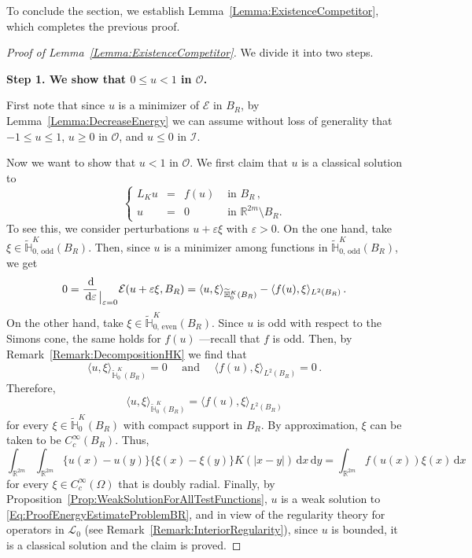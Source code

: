 \documentclass[12pt,reqno]{amsart}
\theoremstyle{definition}
\theoremstyle{remark}
\newcommand{\con}[1]{\mathbb{#1}}
\newcommand{\R}{\con{R}} %
\renewcommand{\H}{\con{H}}
\newcommand{\ecal}{\mathcal{E}}
\newcommand{\ical}{\mathcal{I}}
\newcommand{\lcal}{\mathcal{L}}
\newcommand{\ocal}{\mathcal{O}}
\renewcommand{\d}{\,\mathrm{d}} %
\newcommand\evalat[1]{_{\mkern1.5mu\big\vert_{\scriptstyle #1}}}
\newcommand\beqc[1]{\left\{\begin{array}{#1}}
\newcommand\eeqc{\end{array} \right.}
\def\PDEsystem{rcll}
\numberwithin{equation}{section}
\begin{document}
To conclude the section, we establish Lemma~\ref{Lemma:ExistenceCompetitor}, which completes the previous proof.

\begin{proof}[Proof of Lemma~\ref{Lemma:ExistenceCompetitor}] We divide it into two steps.
	\medskip
	
	\textbf{Step 1. We show that $0\leq u < 1$ in $\ocal$.}
	
	First note that since $u$ is a minimizer of $\ecal$ in $B_R$, by Lemma~\ref{Lemma:DecreaseEnergy} we can assume without loss of generality that $-1 \leq u \leq 1$, $u \geq 0$ in $\ocal$, and $u \leq 0$ in $\ical$. 
	
	
	Now we want to show that $u < 1$ in $\ocal$. We first claim that $u$ is a classical solution to
	\begin{equation}
	\label{Eq:ProofEnergyEstimateProblemBR}
	\beqc{\PDEsystem}
	L_K  u &=& f(u) & \textrm{ in } B_R\,,\\
	u &=& 0 & \textrm{ in }\R^{2m} \setminus B_R.
	\eeqc
	\end{equation}
	To see this, we consider perturbations $u +  \varepsilon \xi$ with $\varepsilon>0$. On the one hand, take $\xi \in \widetilde{\H}^K_{0, \,\mathrm{odd}}(B_R)$. Then, since $u$ is a minimizer among functions in $\widetilde{\H}^K_{0, \,\mathrm{odd}}(B_R)$, we get
	$$
	0 = \dfrac{\d}{\d \varepsilon}\evalat{\varepsilon = 0} \ecal(u +  \varepsilon \xi, B_R) = \langle u,\xi \rangle_{\widetilde{\H}^K_0(B_R)} - \langle f(u),\xi \rangle_{L^2(B_R)}\,.
	$$
	On the other hand, take $\xi \in \widetilde{\H}^K_{0, \,\mathrm{even}}(B_R)$. Since $u$ is odd with respect to the Simons cone, the same holds for $f(u)$ ---recall that $f$ is odd. Then, by Remark~\ref{Remark:DecompositionHK} we find that
	$$
	\langle u,\xi \rangle_{\widetilde{\H}^K_0(B_R)} = 0 \quad \textrm{ and } \quad  \langle f(u),\xi \rangle_{L^2(B_R)} = 0\,.
	$$
	Therefore, 
	$$
	\langle u,\xi \rangle_{\widetilde{\H}^K_0(B_R)} = \langle f(u),\xi \rangle_{L^2(B_R)}
	$$
	for every $\xi \in\widetilde{\H}^K_0(B_R)$ with compact support in  $B_R$. By approximation, $\xi$ can be taken to be $C^\infty_c(B_R)$. Thus,
	$$
	\int_{\R^{2m}}\int_{\R^{2m}} \{u(x)-u(y)\}\{\xi(x)-\xi(y)\} K(|x-y|) \d x \d y = \int_{\R^{2m}} f(u(x)) \xi(x) \d x
	$$
	for every $\xi \in C^\infty_c(\Omega)$ that is doubly radial. Finally, by Proposition~\ref{Prop:WeakSolutionForAllTestFunctions}, $u$ is a weak solution to \eqref{Eq:ProofEnergyEstimateProblemBR}, and in view of the regularity theory for operators in $\lcal_0$ (see Remark~\ref{Remark:InteriorRegularity}), since $u$ is bounded, it is a classical solution and the claim is proved.
	

\end{proof}
\end{document}
